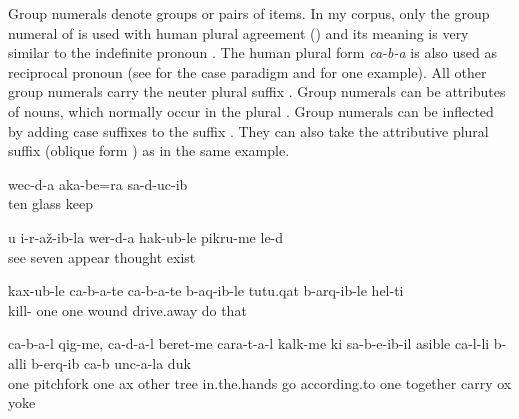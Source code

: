Group numerals denote groups or pairs of items. In my corpus, only the group numeral of   is used with human plural agreement () and its meaning is very similar to the indefinite pronoun . The human plural form \textit{ca-b-a} is also used as reciprocal pronoun (see  for the case paradigm and   for one example). All other group numerals carry the neuter plural suffix  . Group numerals can be attributes of nouns, which normally occur in the plural . Group numerals can be inflected by adding case suffixes to the suffix  . They can also take the attributive plural suffix  (oblique form ) as in the same example.

\ea\label{ex:thedoctortriedtenpairsofglasses}
\gll	wec{\ej}-d-a	{\eppl}a{\pha}{\paaf}k{\lmk}a-be=ra	sa-d-uc-ib\\
	ten	glass	keep\\
\glt	{}
\z

\ea\label{ex:afterIsawyoumanythoughtsarose}
\gll	u	{\paaf}i-r-až-ib-la\parn{,}	wer-d-a	hak{\ej}-ub-le	pikru-me	le-d\\
		see	seven	appear	thought	exist\\
\glt	{}
\z

\ea\label{ex:killingsomewoundingothers}
\gll	kax-ub-le	ca-b-a-te	ca-b-a-te	b-a{\pha}q-ib-le	t{\ej}ut{\ej}u.q{\ej}a{\pha}t{\ej}	b-arq{\ej}-ib-le	hel-t{\lmk}i\\
	kill-	one		one 	wound		drive.away	do	that\\
\glt	{}
\z

\ea\label{ex:somepeopletookpitchforks}
\gll	ca-b-a-l	q{\ej}ig-me,	ca-d-a-l	beret-me	cara-t-a-l	k{\lmk}alk-me	k{\lab}i	sa-b-e{\vuvfr}-ib-il	{\phfr}a{\pha}sible	ca-l-li	b-alli	b-erq{\lmk}-ib	ca-b	unc-a-la	duk{\ej}\\
	one	pitchfork	one	ax	other	tree	in.the.hands	go	according.to	one	\tsc{n-}together	carry		ox	yoke\\
\glt	{}
\z



